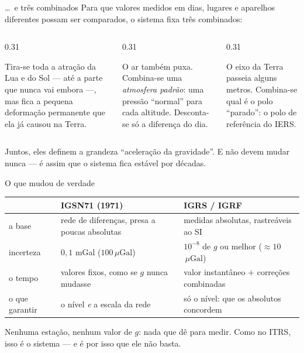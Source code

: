 \documentclass[aspectratio=169,11pt]{beamer}
\newcommand{\sist}[1]{\textcolor{corIdeal}{\textbf{#1}}}
\newcommand{\fram}[1]{\textcolor{corMedido}{\textbf{#1}}}
\newcommand{\uGal}{\ensuremath{\,\mu\mathrm{Gal}}\xspace}
\begin{document}
\begin{frame}{\ldots\ e três combinados}
  Para que valores medidos em dias, lugares e aparelhos diferentes possam ser comparados, o
  sistema fixa três combinados:
  \medskip
  \begin{columns}[T]
    \begin{column}{0.31\textwidth}
      \begin{regra}[title={Maré: ``maré zero''}]
        \scriptsize Tira-se toda a atração da Lua e do Sol --- até a parte que nunca vai
        embora ---, mas fica a pequena deformação permanente que ela já causou na Terra.
      \end{regra}
    \end{column}
    \begin{column}{0.31\textwidth}
      \begin{regra}[title={Ar: ISO 2533:1975}]
        \scriptsize O ar também puxa. Combina-se uma \emph{atmosfera padrão}: uma pressão
        ``normal'' para cada altitude. Desconta-se só a diferença do dia.
      \end{regra}
    \end{column}
    \begin{column}{0.31\textwidth}
      \begin{regra}[title={Polo: o do IERS}]
        \scriptsize O eixo da Terra passeia alguns metros. Combina-se qual é o polo
        ``parado'': o polo de referência do IERS.
      \end{regra}
    \end{column}
  \end{columns}
  \bigskip
  \centering
  Juntos, eles definem a grandeza ``aceleração da gravidade''. E \alert{não devem mudar
  nunca} --- é assim que o sistema fica estável por décadas.
\end{frame}

\begin{frame}{O que mudou de verdade}
  \centering
  \footnotesize
  \renewcommand{\arraystretch}{1.3}
  \begin{tabular}{lp{4.5cm}p{5.2cm}}
    \toprule
    & \textbf{IGSN71} (1971) & \sist{IGRS} / \fram{IGRF} \\
    \midrule
    a base & rede de diferenças, presa a poucas absolutas & medidas absolutas, rastreáveis
      ao SI \\
    incerteza & $0{,}1$ mGal ($100$\uGal) & $10^{-8}$ de $g$ ou melhor ($\approx 10$\uGal) \\
    o tempo & valores fixos, como se $g$ nunca mudasse & valor instantâneo $+$ correções
      combinadas \\
    o que garantir & o nível \emph{e} a escala da rede & só o nível: que os absolutos
      concordem \\
    \bottomrule
  \end{tabular}
  \medskip

  \begin{cuidado}[title={Repare no que não tem na definição do IGRS}]
    \small Nenhuma estação, nenhum valor de $g$: \alert{nada que dê para medir}. Como no
    ITRS, isso é o sistema --- e é por isso que ele não basta.
  \end{cuidado}
\end{frame}
\end{document}
